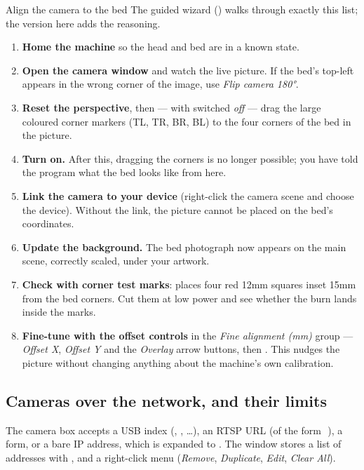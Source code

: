 \begin{walkthrough}{Align the camera to the bed}
The guided wizard () walks through exactly this list; the version
here adds the reasoning.
\begin{enumerate}[label=\arabic*.,leftmargin=1.4em]
  \item \textbf{Home the machine} so the head and bed are in a known state.
  \item \textbf{Open the camera window} and watch the live picture. If the bed's
        top-left appears in the wrong corner of the image, use \emph{Flip camera
        180°}.
  \item \textbf{Reset the perspective}, then --- with 
        switched \emph{off} --- drag the large coloured corner markers
        (TL, TR, BR, BL) to the four corners of the bed in the picture.
  \item \textbf{Turn  on.} After this, dragging the
        corners is no longer possible; you have told the program what the bed
        looks like from here.
  \item \textbf{Link the camera to your device} (right-click the camera scene and
        choose the device). Without the link, the picture cannot be placed on the
        bed's coordinates.
  \item \textbf{Update the background.} The bed photograph now appears on the
        main scene, correctly scaled, under your artwork.
  \item \textbf{Check with corner test marks}:  places
        four red 12\unit{mm} squares inset 15\unit{mm} from the bed corners. Cut
        them at low power and see whether the burn lands inside the marks.
  \item \textbf{Fine-tune with the offset controls} in the \emph{Fine alignment
        (mm)} group --- \emph{Offset X}, \emph{Offset Y} and the
        \emph{Overlay} arrow buttons, then . This nudges the
        picture without changing anything about the machine's own calibration.
\end{enumerate}
\end{walkthrough}

\subsection*{Cameras over the network, and their limits}

The camera  box accepts a USB index (, , \dots), an
RTSP URL (of the form
\,\,), a
 form, or a bare IP address, which is expanded to
. The  window stores a list of
addresses with ,  and a right-click menu
(\emph{Remove}, \emph{Duplicate}, \emph{Edit}, \emph{Clear All}).

